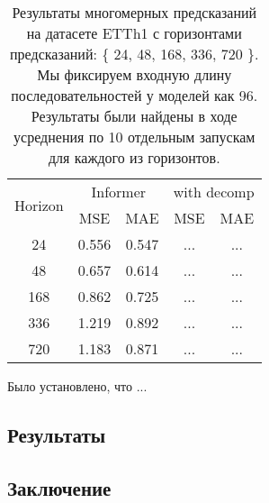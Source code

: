 \begin{table}[!ht]
    \centering
    \begin{tabular}{c  cc  cc}
    \toprule
    \multirow{2}{*}{{Horizon}} 
      & \multicolumn{2}{c}{{Informer}} 
      & \multicolumn{2}{c}{with decomp} \\
    \cmidrule(lr){2-3} \cmidrule(lr){4-5}
      & {MSE} & {MAE} 
      & {MSE} & {MAE} \\
    \midrule
    24   & 0.556 & 0.547 & ... & ... \\
    48   & 0.657 & 0.614 & ... & ... \\
    168  & 0.862 & 0.725 & ... & ... \\
    336  & 1.219 & 0.892 & ... & ... \\
    720  & 1.183 & 0.871 & ... & ... \\
    \bottomrule
    \end{tabular}
    \caption{Результаты многомерных предсказаний на датасете ETTh1 с 
    горизонтами предсказаний: \{ 24, 48, 168, 336, 720 \}. 
    Мы фиксируем входную длину последовательностей у моделей как 96.
    Результаты были найдены в ходе усреднения по 10 отдельным запускам 
    для каждого из горизонтов.}
    \label{tab:etth1-decomp}
\end{table}

Было установлено, что {\color{red} ...}



\subsection{Результаты}

\subsection{Заключение}

